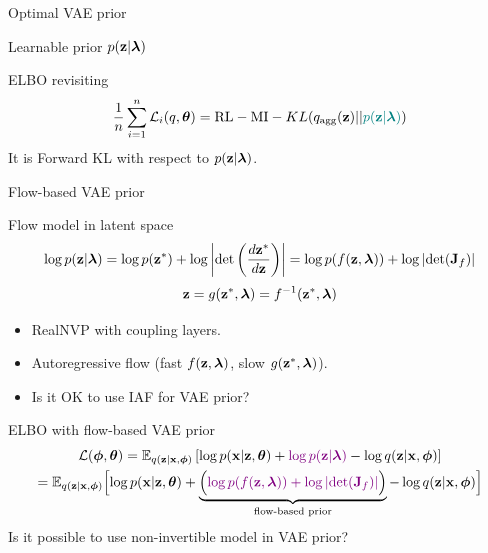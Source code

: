 \begin{frame}{Optimal VAE prior}
\begin{minipage}[t]{0.5\columnwidth}
\begin{block}{Learnable prior $p(\mathbf{z} | \boldsymbol{\lambda})$}
\begin{figure}[h]
			\end{figure}
		\end{block}
	\end{minipage}
	\vspace{-0.4cm}
	\begin{block}{ELBO revisiting}
		\vspace{-0.3cm}
		\[
			\frac{1}{n}\sum_{i=1}^n \mathcal{L}_i(q, \boldsymbol{\theta}) = \text{RL} - \text{MI} -  KL(q_{\text{agg}}(\mathbf{z}) || {\color{teal}p(\mathbf{z} | \boldsymbol{\lambda})})
		\]
		It is Forward KL with respect to $p(\mathbf{z} | \boldsymbol{\lambda})$.
	\end{block}
\end{frame}
\begin{frame}{Flow-based VAE prior}
	\begin{block}{Flow model in latent space}
		\vspace{-0.5cm}
		\[
			\log p(\mathbf{z} | \boldsymbol{\lambda}) = \log p(\mathbf{z}^*) + \log  \left | \det \left(\frac{d \mathbf{z}^*}{d\mathbf{z}}\right)\right| = \log p(f(\mathbf{z}, \boldsymbol{\lambda})) + \log \left | \det (\mathbf{J}_f)\right| 
		\]
		\vspace{-0.3cm}
		\[
			\mathbf{z} = g(\mathbf{z}^*, \boldsymbol{\lambda}) = f^{-1}(\mathbf{z}^*, \boldsymbol{\lambda})
		\]
	\end{block}
	\vspace{-0.3cm}
	\begin{itemize}
		\item RealNVP with coupling layers.
		\item Autoregressive flow (fast $f(\mathbf{z}, \boldsymbol{\lambda})$, slow $g(\mathbf{z}^*, \boldsymbol{\lambda})$).
		\item {\color{gray}Is it OK to use IAF for VAE prior?}
	\end{itemize}
	\begin{block}{ELBO with flow-based VAE prior}
		\vspace{-0.5cm}
		{\small
		\begin{multline*}
			\mathcal{L}(\boldsymbol{\phi}, \boldsymbol{\theta}) = \mathbb{E}_{q(\mathbf{z} | \mathbf{x}, \boldsymbol{\phi})} \left[ \log p(\mathbf{x} | \mathbf{z}, \boldsymbol{\theta}) + {\color{violet}\log p(\mathbf{z} | \boldsymbol{\lambda})} - \log q(\mathbf{z} | \mathbf{x}, \boldsymbol{\phi}) \right] \\
				= \mathbb{E}_{q(\mathbf{z} | \mathbf{x}, \boldsymbol{\phi})} \Bigl[ \log p(\mathbf{x} | \mathbf{z}, \boldsymbol{\theta}) + \underbrace{ \Bigl({\color{violet} \log p(f(\mathbf{z}, \boldsymbol{\lambda})) + \log \left| \det (\mathbf{J}_f) \right|} \Bigr) }_{\text{flow-based prior}} - \log q(\mathbf{z} | \mathbf{x}, \boldsymbol{\phi}) \Bigr] 
		\end{multline*}
		}
		{\color{gray}Is it possible to use non-invertible model in VAE prior?}
	\end{block}
\end{frame}
